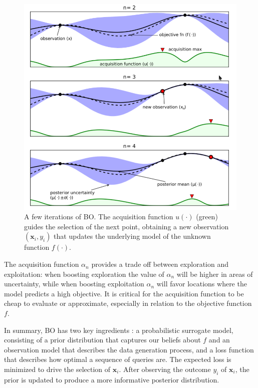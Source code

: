 \documentclass[a4paper, 12pt]{article} %
\begin{document}
	\begin{figure}
		\includegraphics[width=\linewidth]{img/bo.png}
		\caption{A few iterations of BO. The acquisition function $u(\cdot)$ (green) guides the selection of the next point, obtaining a new observation $(\pmb{x}_i, y_i)$ that updates the underlying model of the unknown function $f(\cdot)$.} 
		\label{fig:bo}
	\end{figure}
	The acquisition function $\alpha_n$ provides a trade off between exploration and exploitation: when boosting exploration the value of $\alpha_n$ will be higher in areas of uncertainty, while when boosting exploitation $\alpha_n$ will favor locations where the model predicts a high objective. It is critical for the acquisition function to be cheap to evaluate or approximate, especially in relation to the objective function $f$.
	
	In summary, BO has two key ingredients \cite{BO}: a probabilistic surrogate model, consisting of a prior distribution that captures our beliefs about $f$ and an observation model that describes the data generation process, and a loss function that describes how optimal a sequence of queries are. The expected loss is minimized to drive the selection of $\pmb{x}_i$. After observing the outcome $y_i$ of $\pmb{x}_i$, the prior is updated to produce a more informative posterior distribution.
	
\end{document}
